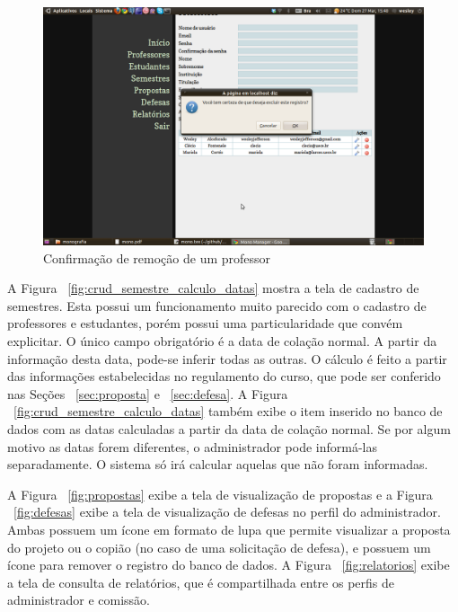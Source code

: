 \begin{figure}[h!tb]
\centering
\includegraphics[width=1\textwidth]{fig/telas/administrador/crud_professor_remocao.png}
\caption{Confirmação de remoção de um professor}
\label{fig:crud_professor_remocao}
\end{figure}

A Figura ~\ref{fig:crud_semestre_calculo_datas} mostra a tela de cadastro de semestres. Esta possui um funcionamento
muito parecido com o cadastro de professores e estudantes, porém possui uma particularidade que 
convém explicitar. O único campo obrigatório é a data de colação normal. A partir da informação desta
data, pode-se inferir todas as outras. O cálculo é feito a partir das informações estabelecidas
no regulamento do curso, que pode ser conferido nas Seções ~\ref{sec:proposta} e ~\ref{sec:defesa}.
A Figura ~\ref{fig:crud_semestre_calculo_datas} também exibe o item inserido no banco de dados com as
datas calculadas a partir da data de colação normal. Se por algum motivo as datas forem diferentes,
o administrador pode informá-las separadamente. O sistema só irá calcular aquelas que não foram
informadas.

A Figura ~\ref{fig:propostas} exibe a tela de visualização de propostas e a Figura ~\ref{fig:defesas}
exibe a tela de visualização de defesas no perfil do administrador. Ambas possuem um ícone em formato
de lupa que permite visualizar a proposta do projeto ou o copião (no caso de uma solicitação de defesa), e
possuem um ícone para remover o registro do banco de dados. A Figura ~\ref{fig:relatorios} exibe a tela
de consulta de relatórios, que é compartilhada entre os perfis de administrador e comissão.


